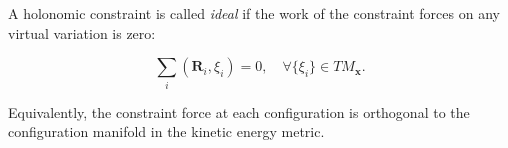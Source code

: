 A holonomic constraint is called \textit{ideal} if the work of the constraint forces on any virtual variation is zero:

$$\sum_i (\mathbf{R}_i, \xi_i) = 0, \quad \forall \{\xi_i\} \in TM_{\mathbf{x}}.$$

Equivalently, the constraint force at each configuration is orthogonal to the configuration manifold in the kinetic energy metric.
